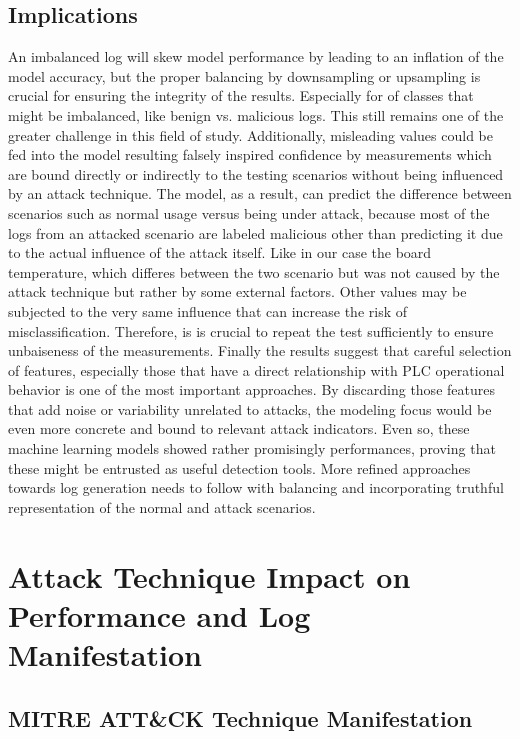 \documentclass[Master,BMR,english]{twbook}
\begin{document}
 \subsection{Implications}

An imbalanced log will skew model performance by leading to an inflation of the model accuracy, but the proper balancing by downsampling or upsampling is crucial for ensuring the integrity of the results. Especially for of classes that might be imbalanced, like benign vs. malicious logs. This still remains one of the greater challenge in this field of study. Additionally, misleading values could be fed into the model resulting falsely inspired confidence by measurements which are bound directly or indirectly to the testing scenarios without being influenced by an attack technique. The model, as a result, can predict the difference between scenarios such as normal usage versus being under attack, because most of the logs from an attacked scenario are labeled malicious other than predicting it due to the actual influence of the attack itself. Like in our case the board temperature,  which differes between the two scenario but was not caused by the attack technique but rather by some external factors. Other values may be subjected to the very same influence that can increase the risk of misclassification. Therefore, is is crucial to repeat the test sufficiently to ensure unbaiseness of the measurements. Finally the results suggest that careful selection of features, especially those that have a direct relationship with PLC operational behavior is one of the most important approaches. By discarding those features that add noise or variability unrelated to attacks, the modeling focus would be even more concrete and bound to relevant attack indicators. Even so, these machine learning models showed rather promisingly performances, proving that these might be entrusted as useful detection tools. More refined approaches towards log generation needs to follow with balancing and incorporating truthful representation of the normal and attack scenarios.



\section{Attack Technique Impact on Performance and Log Manifestation}

\subsection{MITRE ATT\&CK Technique Manifestation}
\end{document}

